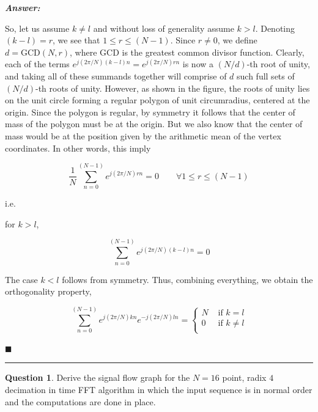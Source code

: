 \documentclass[12pt]{article}
\theoremstyle{definition}
\newtheorem{question}{Question}
\newenvironment{answer}{
    \textbf{\textit{Answer:}} \qquad
}{\hfill $\blacksquare$ \\ \begin{center}
    \rule{0.6\linewidth}{0.5px}    
\end{center}
}
\begin{document}
\begin{answer}
    So, let us assume $k \neq l$ and without loss of generality assume $k > l$. Denoting $(k - l) = r$, we see that $1 \leq r \leq (N-1)$. Since $r \neq 0$, we define $d = \text{GCD}(N, r)$, where $\text{GCD}$ is the greatest common divisor function. Clearly, each of the terms $e^{j(2\pi / N)(k-l)n} = e^{j(2\pi / N)rn}$ is now a $(N/d)$-th root of unity, and taking all of these summands together will comprise of $d$ such full sets of $(N/d)$-th roots of unity. However, as shown in the figure, the roots of unity lies on the unit circle forming a regular polygon of unit circumradius, centered at the origin. Since the polygon is regular, by symmetry it follows that the center of mass of the polygon must be at the origin. But we also know that the center of mass would be at the position given by the arithmetic mean of the vertex coordinates. In other words, this imply 

    $$
    \dfrac{1}{N} \sum_{n = 0}^{(N-1)} e^{j(2\pi / N)rn} = 0\qquad \forall 1 \leq r \leq (N-1)
    $$

    i.e.

    for $k > l$, 

    $$
    \sum_{n = 0}^{(N-1)} e^{j(2\pi / N)(k-l)n} = 0
    $$

    The case $k < l$ follows from symmetry. Thus, combining everything, we obtain the orthogonality property,

    $$
    \sum_{n = 0}^{(N-1)} e^{j(2\pi / N)kn} e^{-j(2\pi / N)ln} = \begin{cases}
        N & \text{ if } k = l\\
        0 & \text{ if } k \neq l\\
    \end{cases}
    $$
    
\end{answer}





\begin{question}
    Derive the signal flow graph for the $N = 16$ point, radix $4$ decimation in time FFT algorithm in which the input sequence is in normal order and the computations are done in place.
\end{question}
\end{document}
